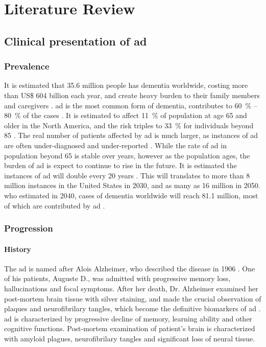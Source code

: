 \chapter{Literature Review}

\section{Clinical presentation of \gls{ad}}
\subsection{Prevalence}
It is estimated that 35.6 million people has dementia worldwide, costing more than US\$ 604 billion each year, and create heavy burden to their family members and caregivers \citep{who13}. \gls{ad} is the most common form of dementia, contributes to \SI{60}{\percent} -- \SI{80}{\percent} of the cases \citep{ad16}. It is estimated to affect \SI{11}{\percent} of population at age 65 and older in the North America, and the risk triples to \SI{33}{\percent} for individuals beyond 85 \citep{hebert13}. The real number of patients affected by \gls{ad} is much larger, as instances of \gls{ad} are often under-diagnosed and under-reported \citep{barrett06, zaleta12}. While the rate of \gls{ad} in population beyond 65 is stable over years, however as the population ages, the burden of \gls{ad} is expect to continue to rise in the future. It is estimated the instances of \gls{ad} will double every 20 years \citep{who13, hebert13}. This will translates to more than 8 million instances in the United States in 2030, and as many as 16 million in 2050. \gls{who} estimated in 2040, cases of dementia worldwide will reach 81.1 million, most of which are contributed by \gls{ad} \citep{who13}. 

\subsection{Progression}
\subsubsection{History}
The \gls{ad} is named after Alois Alzheimer, who described the disease in 1906 \citep{goedert06}. One of his patients, Auguste D., was admitted with progressive memory loss, hallucinations and focal symptoms. After her death, Dr. Alzheimer examined her post-mortem brain tissue with silver staining, and made the crucial observation of plaques and neurofibrilary tangles, which become the definitive biomarkers of \gls{ad} \citep{goedert06, dubois16}. \gls{ad} is characterized by progressive decline of memory, learning ability and other cognitive functions. Post-mortem examination of patient's brain is characterized with amyloid plagues, neurofibrilary tangles and significant loss of neural tissue.

